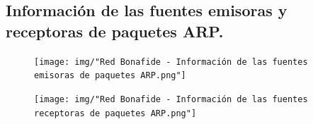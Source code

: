 \subsection{Información de las fuentes emisoras y receptoras de paquetes ARP.}

\begin{figure}[h!]
    \centering                                                       
    \texttt{[image: img/"Red Bonafide - Información de las fuentes emisoras de paquetes ARP.png"]}
    \caption{}
    \label{bonafide:emisoras}
\end{figure}

\begin{figure}[h!]
    \centering                                                       
    \texttt{[image: img/"Red Bonafide - Información de las fuentes receptoras de paquetes ARP.png"]}
    \caption{}
    \label{bonafide:receptoras}
\end{figure}







